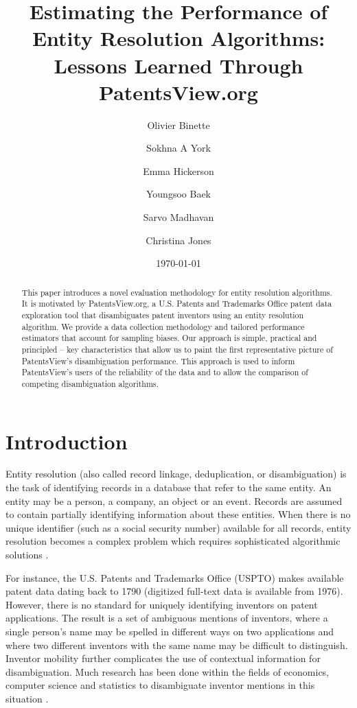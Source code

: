 \documentclass[fontsize=11pt]{article}
\title{Estimating the Performance of Entity Resolution Algorithms: Lessons Learned Through PatentsView.org}
\author[1,2]{Olivier Binette}
\author[2]{Sokhna A York}
\author[2]{Emma Hickerson}
\author[1]{Youngsoo Baek}
\author[2]{Sarvo Madhavan}
\author[2]{Christina Jones}
\affil[1]{Duke University}
\affil[2]{American Institutes for Research}
\date{\today}
\newcommand{\ob}[1]{{#1}}
\theoremstyle{definition}
\begin{document}
\maketitle

\begin{abstract}
This paper introduces a novel evaluation methodology for entity resolution algorithms. It is motivated by PatentsView.org, a U.S. Patents and Trademarks Office patent data exploration tool that disambiguates patent inventors using an entity resolution algorithm. We provide a data collection methodology and tailored performance estimators that account for sampling biases. Our approach is simple, practical and principled -- key characteristics that allow us to paint the first representative picture of PatentsView's disambiguation performance. This approach is used to inform PatentsView's users of the reliability of the data and to allow the comparison of competing disambiguation algorithms.
\end{abstract}

\section{Introduction}
Entity resolution (also called record linkage, deduplication, or disambiguation) is the task of identifying records in a database that refer to the same entity. An entity may be a person, a company, an object or an event. Records are assumed to contain partially identifying information about these entities. When there is no unique identifier (such as a social security number) available for all records, entity resolution becomes a complex problem which requires sophisticated algorithmic solutions \citep{Herzog2007, Christen2012, Dong2015, Ilyas2019, Christophides2019, Christen2019, Papadakis2021, Binette2022a}. 

For instance, the U.S. Patents and Trademarks Office (USPTO) makes available patent data dating back to 1790 \ob{(digitized full-text data is available from 1976)}. However, there is no standard for uniquely identifying inventors on patent applications. The result is a set of ambiguous mentions of inventors, where a single person's name may be spelled in different ways on two applications and where two different inventors with the same name may be difficult to distinguish. \ob{Inventor mobility further complicates the use of contextual information for disambiguation.} Much research has been done within the fields of economics, computer science and statistics to disambiguate inventor mentions \ob{in this situation} \citep{trajtenberg2008identification, ferreira2012brief, ventura2013methods, Li2014, Ventura2015, kim2016random, yang2017mixture, morrison2017disambiguation, muller2017semantic, traylor2017learning, balsmeier2018machine,tam2019optimal, monath2019scalable, doherr2021disambiguation}.
\end{document}
